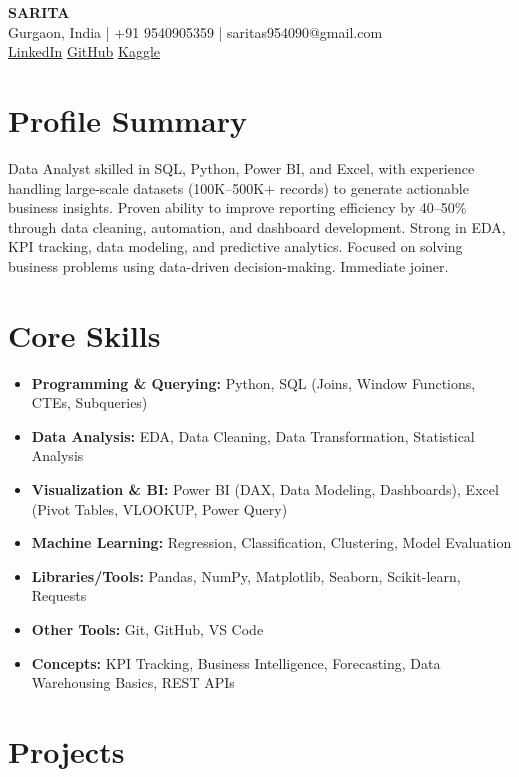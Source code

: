 \documentclass[letterpaper,11pt]{article}
\begin{document}
\begin{center}
{\LARGE \textbf{SARITA}}\\
Gurgaon, India \quad | \quad +91 9540905359 \quad | \quad saritas954090@gmail.com\\
\href{https://www.linkedin.com/in/saru-official}{LinkedIn} \quad
\href{https://github.com/sarita-6668}{GitHub} \quad
\href{https://www.kaggle.com/saritas95}{Kaggle}
\end{center}

\section*{Profile Summary}
Data Analyst skilled in SQL, Python, Power BI, and Excel, with experience handling large-scale datasets (100K--500K+ records) to generate actionable business insights. Proven ability to improve reporting efficiency by 40--50\% through data cleaning, automation, and dashboard development. Strong in EDA, KPI tracking, data modeling, and predictive analytics. Focused on solving business problems using data-driven decision-making. Immediate joiner.

\section*{Core Skills}
\begin{itemize}[leftmargin=*]
\item \textbf{Programming \& Querying:} Python, SQL (Joins, Window Functions, CTEs, Subqueries)
\item \textbf{Data Analysis:} EDA, Data Cleaning, Data Transformation, Statistical Analysis
\item \textbf{Visualization \& BI:} Power BI (DAX, Data Modeling, Dashboards), Excel (Pivot Tables, VLOOKUP, Power Query)
\item \textbf{Machine Learning:} Regression, Classification, Clustering, Model Evaluation
\item \textbf{Libraries/Tools:} Pandas, NumPy, Matplotlib, Seaborn, Scikit-learn, Requests
\item \textbf{Other Tools:} Git, GitHub, VS Code
\item \textbf{Concepts:} KPI Tracking, Business Intelligence, Forecasting, Data Warehousing Basics, REST APIs
\end{itemize}

\section*{Projects}
\end{document}
